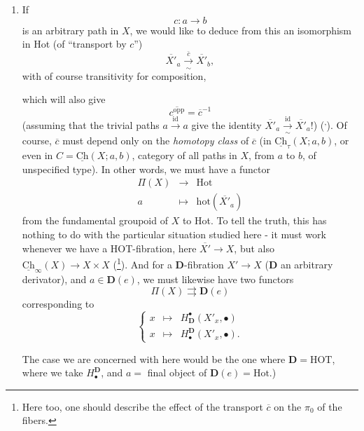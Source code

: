 \documentclass[11pt]{article}
\newcommand{\printedpage}[1]{\marginpar{\footnotesize p.~#1}}
\newcommand{\msp}[1]{\marginpar{\footnotesize [#1]}}
\newcommand{\uCh}{\underline{\mathrm{Ch}}}
\newcommand{\hot}{\mathrm{hot}}
\begin{document}
\begin{enumerate}[label={}, leftmargin=*]
\item[4$^o$)] If
\[
c:a\longrightarrow b
\]
is an arbitrary path in $X$, we would like to deduce from this an isomorphism in Hot (of ``transport by $c$'') %
\[
\overline{X'}_a\xrightarrow[\sim]{\bar{c}}\overline{X'}_b,
\]
with of course transitivity for composition,

\msp{page 141}

which will also give
\[
\overline{c^{\mathrm{opp}}}=\overline{c}^{-1}
\]
(assuming that the trivial paths $a\xrightarrow{\mathrm{id}}a$ give the identity $\overline{X'}_a\xrightarrow[\sim]{\mathrm{id}}\overline{X'}_a$!) (\footnotemark[32]\textsuperscript{,}\footnotemark[33]). Of course, $\overline{c}$ must depend only on the \textit{homotopy class} of $\overline{c}$ (in %
\printedpage{88}
$\uCh_\tau(X;a,b)$, or even in $C=\uCh(X;a,b)$, category of all paths in $X$, from $a$ to $b$, of unspecified type). In other words, we must have a functor
\[
\begin{array}{rcl}
\Pi(X) & \longrightarrow & \mathrm{Hot}\\[4pt]
a & \longmapsto & \hot(\overline{X'}_a)
\end{array}
\]
from the fundamental groupoid of $X$ to Hot. To tell the truth, this has nothing to do with the particular situation studied here - it must work whenever we have a HOT-fibration, here $\overline{X'}\longrightarrow X$, but also $\uCh_\infty(X)\longrightarrow X\times X$ (\footnote[34]{Here too, one should describe the effect of the transport $\overline{c}$ on the $\pi_0$ of the fibers.}). And for a $\mathbf{D}$-fibration $X'\longrightarrow X$ ($\mathbf{D}$ an arbitrary derivator), and $a\in\mathbf{D}(e)$, we must likewise have two functors
\[
\Pi(X)\rightrightarrows\mathbf{D}(e)
\]
corresponding to
\[
\left\{\begin{array}{lcl}
x & \longmapsto & H^\bullet_{\mathbf{D}}(X'_x,\bullet)\\[4pt]
x & \longmapsto & H_\bullet^{\mathbf{D}}(X'_x,\bullet).
\end{array}\right.
\]

\msp{page 142}

The case we are concerned with here would be the one where $\mathbf{D}=\mathrm{HOT}$, where we take $H^{\mathbf{D}}_\bullet$, and $a=$ final object of $\mathbf{D}(e)=\mathrm{Hot}$.)


\end{enumerate}
\end{document}
